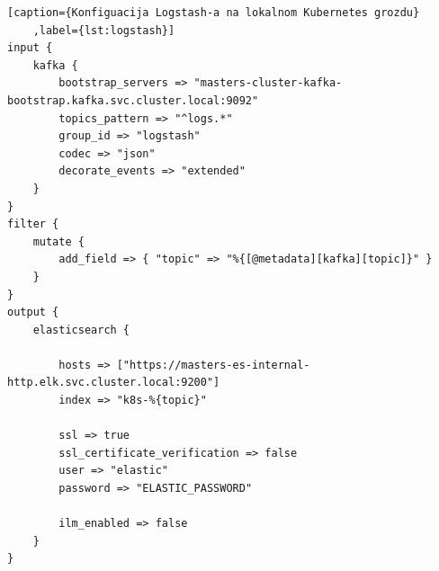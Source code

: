 \documentclass[times, utf8, diplomski]{fer}
\begin{document}
\clearpage
\begin{lstlisting}[caption={Konfiguacija Logstash-a na lokalnom Kubernetes grozdu}
	,label={lst:logstash}]
input {
	kafka {
		bootstrap_servers => "masters-cluster-kafka-bootstrap.kafka.svc.cluster.local:9092"
		topics_pattern => "^logs.*"
		group_id => "logstash"
		codec => "json"
		decorate_events => "extended"
	}
}
filter {
	mutate {
		add_field => { "topic" => "%{[@metadata][kafka][topic]}" }
	}
}
output {
	elasticsearch {
		
		hosts => ["https://masters-es-internal-http.elk.svc.cluster.local:9200"]
		index => "k8s-%{topic}"
		
		ssl => true
		ssl_certificate_verification => false
		user => "elastic"
		password => "ELASTIC_PASSWORD"
		
		ilm_enabled => false
	}
}
\end{lstlisting}
\end{document}
